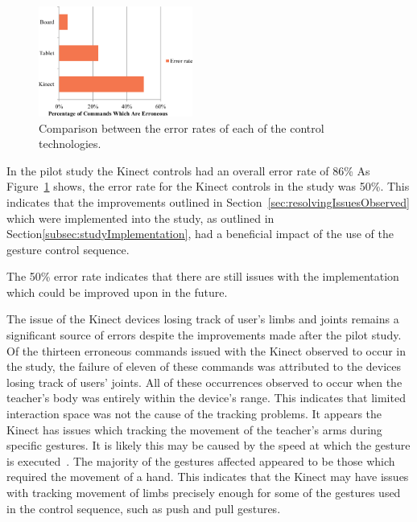 \documentclass[link]{IWCOMP}
\begin{document}
\begin{figure}[h]
   \centering
   \includegraphics[width=0.45\textwidth]{figures/bar_chart_errors.png}
   \caption{Comparison between the error rates of each of the control technologies.}
   \label{fig:controlDevicesErrors}
 \end{figure}

In the pilot study the Kinect controls had an overall error rate of 86\%
As Figure~\ref{fig:controlDevicesErrors} shows, the error rate for the Kinect controls in the study was 50\%.
This indicates that the improvements outlined in Section~\ref{sec:resolvingIssuesObserved} which were implemented into the study, as outlined in Section\ref{subsec:studyImplementation}, had a beneficial impact of the use of the gesture control sequence.

The 50\% error rate indicates that there are still issues with the implementation which could be improved upon in the future.

The issue of the Kinect devices losing track of user's limbs and joints remains a significant source of errors despite the improvements made after the pilot study.
Of the thirteen erroneous commands issued with the Kinect observed to occur in the study, the failure of eleven of these commands was attributed to the devices losing track of users' joints.
All of these occurrences observed to occur when the teacher's body was entirely within the device's range.
This indicates that limited interaction space was not the cause of the tracking problems.
It appears the Kinect has issues which tracking the movement of the teacher's arms during specific gestures.
It is likely this may be caused by the speed at which the gesture is executed~\citep{Winkler2012}.
The majority of the gestures affected appeared to be those which required the movement of a hand.
This indicates that the Kinect may have issues with tracking movement of limbs precisely enough for some of the gestures used in the control sequence, such as push and pull gestures.
\end{document}
